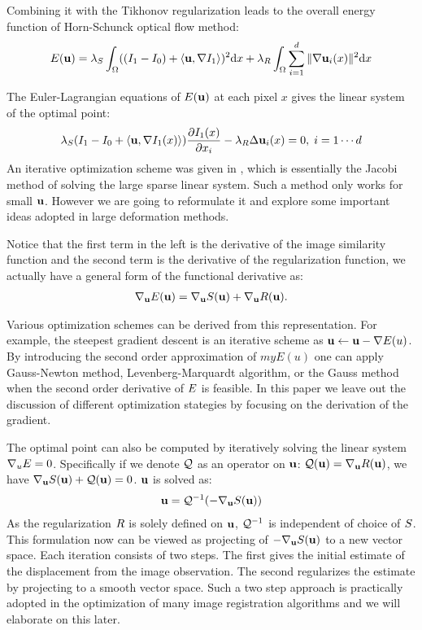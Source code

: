 \documentclass[letterpaper,12pt]{article}
\begin{document}
Combining it with the Tikhonov regularization leads to the overall energy function of Horn-Schunck optical flow method: 
\begin{align}
E(\mathbf{u}) = \lambda_S \int_\Omega ((I_1 - I_0 ) + \langle \mathbf{u}, \nabla I_1 \rangle)^2 \text{d} x
+ \lambda_R \int_\Omega \sum_{i=1}^d \| \nabla \mathbf{u}_i(x) \|^2 \text{d} x
\end{align}

The Euler-Lagrangian equations of $E(\mathbf{u})$ at each pixel $x$ gives the linear system of the optimal point:
\begin{align}
\lambda_S (I_1 - I_0  + \langle \mathbf{u}, \nabla I_1(x) \rangle) \frac{\partial I_1(x)}{\partial x_i}
- \lambda_R \Delta \mathbf{u}_i(x) = 0
, \; i=1 \cdots d
\label{eq:opticalflow}
\end{align}
An iterative optimization scheme was given in \cite{Horn1981}, which is essentially the Jacobi method of solving the large sparse linear system. Such a method only works for small $\mathbf{u}$. However we are going to reformulate it and explore some important ideas adopted in large deformation methods. 

Notice that the first term in the left is the derivative of the image similarity function and the second term is the derivative of the regularization function, we actually have a general form of the functional derivative as:
\begin{align}
\nabla_{\mathbf{u}} E(\mathbf{u}) = \nabla_{\mathbf{u}} S(\mathbf{u}) + \nabla_{\mathbf{u}} R(\mathbf{u}).
\end{align}


Various optimization schemes can be derived from this representation. For example, the steepest gradient descent is an iterative scheme as $\mathbf{u} \leftarrow \mathbf{u} - \nabla E(u)$. By introducing the second order approximation of $myE(u)$ one can apply Gauss-Newton method, Levenberg-Marquardt algorithm, or the Gauss method when the second order derivative of $E$ is feasible. In this paper we leave out the discussion of different optimization stategies by focusing on the derivation of the gradient.

The optimal point can also be computed by iteratively solving the linear system $\nabla_u E = 0$. 
Specifically if we denote $\mathcal{Q}$ as an operator on $\mathbf{u}$: $\mathcal{Q}(\mathbf{u}) = \nabla_{\mathbf{u}} R(\mathbf{u})$, we have $\nabla_{\mathbf{u}} S(\mathbf{u}) + \mathcal{Q}(\mathbf{u}) = 0$. $\mathbf{u}$ is solved as: 
\begin{align}
\mathbf{u} = \mathcal{Q}^{-1}(-\nabla_{\mathbf{u}} S(\mathbf{u}))
\label{eq:projection}
\end{align}
As the regularization $R$ is solely defined on $\mathbf{u}$, $\mathcal{Q}^{-1}$ is
independent of choice of $S$. This formulation now can be viewed as
projecting of $-\nabla_{\mathbf{u}} S(\mathbf{u})$ to a new vector space. Each iteration
consists of two steps. The first gives the initial estimate of the displacement from the image observation. The second regularizes the estimate by projecting to a smooth vector space. Such a two step approach is practically adopted in the optimization of many image registration algorithms and we will elaborate on this later.
\end{document}
